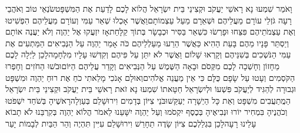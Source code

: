 \documentclass[../main/main.tex]{subfiles}
\begin{document}
\begin{multicols}{\ncols}
וָאֹמַר שִׁמְעוּ נָא רָאשֵׁי יַעֲקֹב וּקְצִינֵי בֵּית יִשְׂרָאֵל הֲלוֹא לָכֶם לָדַעַת אֶת הַמִּשְׁפָּט\PreVerseSpace{}שֹׂנְאֵי טוֹב וְאֹהֲבֵי רָעָה גֹּזְלֵי עוֹרָם מֵעֲלֵיהֶם וּשְׁאֵרָם מֵעַל עַצְמוֹתָם\PreVerseSpace{}וַאֲשֶׁר אָכְלוּ שְׁאֵר עַמִּי וְעוֹרָם מֵעֲלֵיהֶם הִפְשִׁיטוּ וְאֶת עַצְמֹתֵיהֶם פִּצֵּחוּ וּפָרְשׂוּ כִּשְׁאֵר\SubEnd{} בַּסִּיר וּכְבָשָׂר בְּתוֹךְ קַלָּחַת\PreVerseSpace{}אָז יִזְעֲקוּ אֶל יַהְוֶה וְלֹא יַעֲנֶה אוֹתָם וְיַסְתֵּר פָּנָיו מֵהֶם בָּעֵת הַהִיא כַּאֲשֶׁר הֵרֵעוּ מַעַלְלֵיהֶם כֹּה אָמַר יַהְוֶה עַל הַנְּבִיאִים הַמַּתְעִים אֶת עַמִּי הַנֹּשְׁכִים בְּשִׁנֵּיהֶם וְקָרְאוּ שָׁלוֹם וַאֲשֶׁר לֹא יִתֵּן עַל פִּיהֶם וְקִדְּשׁוּ עָלָיו מִלְחָמָה\PreVerseSpace{}לָכֵן לַיְלָה לָכֶם מֵחָזוֹן וְחָשְׁכָה לָכֶם מִקְּסֹם וּבָאָה הַשֶּׁמֶשׁ עַל הַנְּבִיאִים וְקָדַר עֲלֵיהֶם הַיּוֹם\PreVerseSpace{}וּבֹשׁוּ הַחֹזִים וְחָפְרוּ הַקֹּסְמִים וְעָטוּ עַל שָׂפָם כֻּלָּם כִּי אֵין מַעֲנֵה אֱלֹהִים\PreVerseSpace{}וְאוּלָם אָנֹכִי מָלֵאתִי כֹחַ אֶת רוּחַ יַהְוֶה וּמִשְׁפָּט וּגְבוּרָה לְהַגִּיד לְיַעֲקֹב פִּשְׁעוֹ וּלְיִשְׂרָאֵל חַטָּאתוֹ \ClosedSection{}שִׁמְעוּ נָא זֹאת רָאשֵׁי בֵּית יַעֲקֹב וּקְצִינֵי בֵּית יִשְׂרָאֵל הַמֲתַעֲבִים מִשְׁפָּט וְאֵת כָּל הַיְשָׁרָה יְעַקֵּשׁוּ\PreVerseSpace{}בֹּנֵי\SubEnd{} צִיּוֹן בְּדָמִים וִירוּשָׁלֵם בְּעַוְלָה\PreVerseSpace{}רָאשֶׁיהָ בְּשֹׁחַד יִשְׁפֹּטוּ וְכֹהֲנֶיהָ בִּמְחִיר יוֹרוּ וּנְבִיאֶיהָ בְּכֶסֶף יִקְסֹמוּ וְעַל יַהְוֶה יִשָּׁעֵנוּ לֵאמֹר הֲלוֹא יַהְוֶה בְּקִרְבֵּנוּ לֹא תָבוֹא עָלֵינוּ רָעָה\PreVerseSpace{}לָכֵן בִּגְלַלְכֶם צִיּוֹן שָׂדֶה תֵחָרֵשׁ וִירוּשָׁלֵם עִיִּין תִּהְיֶה וְהַר הַבַּיִת לְבָמוֹת יָעַר\OpenSection{}\par


\end{multicols}
\end{document}
